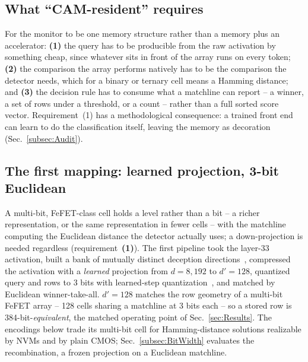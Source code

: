 \documentclass[conference]{IEEEtran}
\newcommand{\fefet}{{FeFET}\xspace}
\begin{document}
\subsection{What ``CAM-resident'' requires}
\label{subsec:Requirements}
For the monitor to be one memory structure rather than a memory plus
an accelerator: {\bf (1)} the query has to be producible from the
raw activation by something cheap, since whatever sits in front of
the array runs on every token; {\bf (2)} the comparison the array
performs natively has to be the comparison the detector needs, which
for a binary or ternary cell means a Hamming distance; and {\bf (3)}
the decision rule has to consume what a matchline can report -- a
winner, a set of rows under a threshold, or a count -- rather than a
full sorted score vector. Requirement~(1) has a methodological
consequence: a trained front end can learn to do the classification
itself, leaving the memory as decoration (Sec.~\ref{subsec:Audit}).

\subsection{The first mapping: learned projection, 3-bit Euclidean}
\label{subsec:FirstPipeline}
\label{subsec:PathBack}
A multi-bit, \fefet-class cell holds a level rather than a bit -- a
richer representation, or the same representation in fewer cells --
with the matchline computing the Euclidean distance the detector
actually uses; a down-projection is needed regardless
(requirement~{\bf (1)}). The first pipeline took the layer-33
activation, built a bank of mutually
distinct deception directions~\cite{ravfogel2020inlp}, compressed the
activation with a \emph{learned} projection from $d=8{,}192$ to
$d'=128$, quantized query and rows to 3 bits with learned-step
quantization~\cite{esser2020lsq}, and matched by Euclidean
winner-take-all. $d'=128$ matches the row
geometry of a multi-bit \fefet array -- 128 cells sharing a
matchline at 3 bits each -- so a stored row is
384-bit-\emph{equivalent}, the matched operating point of
Sec.~\ref{sec:Results}. The encodings below trade its
multi-bit cell for Hamming-distance solutions realizable by NVMs and
by plain CMOS; Sec.~\ref{subsec:BitWidth} evaluates the
recombination, a frozen projection on a Euclidean matchline.
\end{document}

